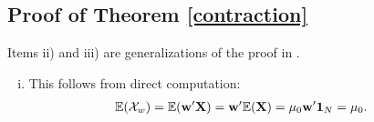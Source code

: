 \documentclass[11pt]{article}
\newcommand{\E}{\mathbb{E}}
\theoremstyle{definition}
\theoremstyle{definition}
\def\one{{\bf 1}}
\def\w{{\bf w}}
\def\X{{\bf X}}
\def\E{{\mathbb E}}
\begin{document}
\subsection{Proof of Theorem \ref{contraction}}
Items ii) and iii) are generalizations of the proof in \cite{Ranjan08}. 
\begin{enumerate}[i)]
\item
This follows from direct computation:
\begin{align*}
\E(\mathcal{X}_w) = \E(\w' \X) &= \w' \E(\X) = \mu_0 \w' \one_N = \mu_0.
\end{align*}


\end{enumerate}
\end{document}

